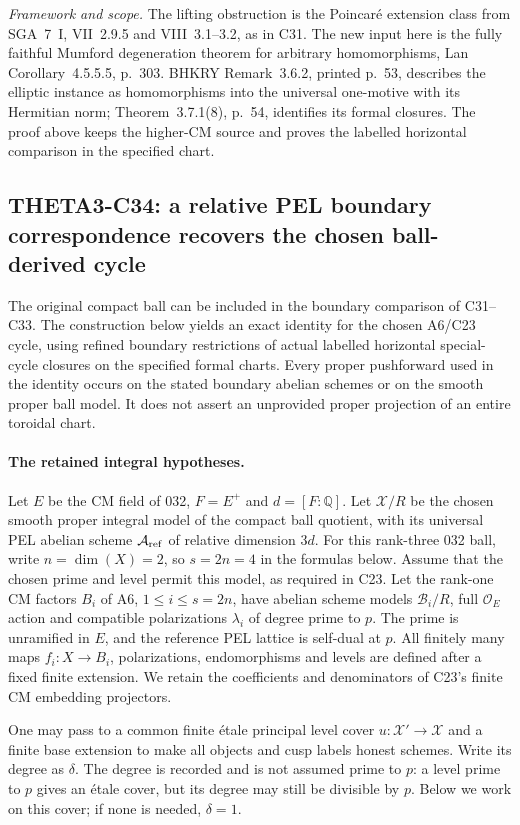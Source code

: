 \documentclass[11pt]{article}
\newcommand{\Q}{\mathbb Q}\newcommand{\C}{\mathbb C}\newcommand{\Z}{\mathbb Z}\newcommand{\R}{\mathbb R}\newcommand{\A}{\mathbb A}\newcommand{\OO}{\mathcal O}
\newcommand{\framework}[1]{\par\smallskip\noindent\textit{Framework and scope.} #1\par}
\theoremstyle{definition}\newtheorem{definition}[theorem]{Definition}\newtheorem{remark}[theorem]{Remark}
\begin{document}
\framework{The lifting obstruction is the
Poincar\'e extension class from SGA~7~I,
VII~2.9.5 and VIII~3.1--3.2, as in C31.
The new input here is the fully faithful
Mumford degeneration theorem for arbitrary
homomorphisms, Lan Corollary~4.5.5.5,
p.~303. BHKRY Remark~3.6.2, printed
p.~53, describes the elliptic instance
as homomorphisms into the universal
one-motive with its Hermitian norm;
Theorem~3.7.1(8), p.~54, identifies its
formal closures. The proof above keeps
the higher-CM source and proves the
labelled horizontal comparison in the
specified chart.}


\subsection{THETA3-C34: a relative PEL boundary correspondence recovers the chosen ball-derived cycle}\label{C34}

The original compact ball can be included in the boundary
comparison of C31--C33. The construction below yields an
exact identity for the chosen A6/C23 cycle, using refined
boundary restrictions of actual labelled horizontal
special-cycle closures on the specified formal charts. Every proper pushforward used in
the identity occurs on the stated boundary abelian schemes
or on the smooth proper ball model. It does not assert an
unprovided proper projection of an entire toroidal chart.

\paragraph{The retained integral hypotheses.}
Let $E$ be the CM field of 032, $F=E^+$ and
$d=[F:\Q]$. Let $\mathcal X/R$ be the chosen smooth
proper integral model of the compact ball quotient,
with its universal PEL abelian scheme
$\mathcal A_{\rm ref}$ of relative dimension $3d$.
For this rank-three 032 ball, write
$n=\dim(X)=2$, so $s=2n=4$ in the formulas below.
Assume that the chosen prime and level permit this
model, as required in C23. Let the rank-one CM
factors $B_i$ of A6, $1\leq i\leq s=2n$, have
abelian scheme models $\mathcal B_i/R$, full
$\mathcal O_E$ action and compatible polarizations
$\lambda_i$ of degree prime to $p$. The prime is
unramified in $E$, and the reference PEL lattice is
self-dual at $p$. All finitely many maps
$f_i:X\to B_i$, polarizations, endomorphisms and
levels are defined after a fixed finite extension.
We retain the coefficients and denominators of
C23's finite CM embedding projectors.

One may pass to a common finite \'etale principal
level cover $u:\mathcal X'\to\mathcal X$ and a
finite base extension to make all objects and cusp
labels honest schemes. Write its degree as
$\delta$. The degree is recorded and is not
assumed prime to $p$: a level prime to $p$ gives
an \'etale cover, but its degree may still be
divisible by $p$. Below we work on this cover;
if none is needed, $\delta=1$.
\end{document}
